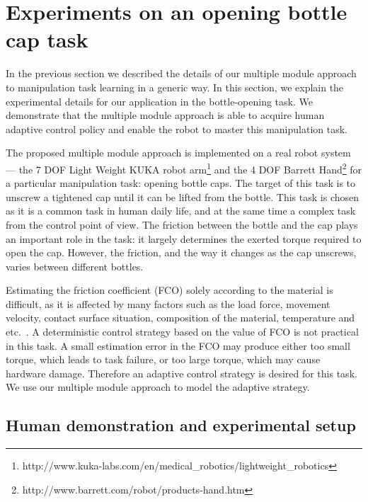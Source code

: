 \section{Experiments on an opening bottle cap task}
\label{cha4:sec3}

In the previous section we described the details of our multiple
module approach to manipulation task learning in a generic way. In this section,
we explain the experimental details for our application in the
bottle-opening task.  We demonstrate that the multiple module approach
is able to acquire human adaptive control policy and enable the robot
to master this manipulation task.

The proposed multiple module approach is implemented on a real robot system
--- the 7 DOF Light Weight KUKA robot arm\footnote{http://www.kuka-labs.com/en/medical\_robotics/lightweight\_robotics} and the 4 DOF Barrett Hand\footnote{http://www.barrett.com/robot/products-hand.htm}
for a particular manipulation task: opening bottle caps. The target of
this task is to unscrew a tightened cap until it can be lifted from
the bottle. This task is chosen as it is a common task in human daily
life, and at the same time a
complex task from the control point of view. The friction between the
bottle and the cap plays an important role in the task: it largely
determines the exerted torque required to open the cap. However, the
friction, and the way it changes as the cap unscrews, varies
between different bottles.


Estimating the friction coefficient (FCO) solely according to the
material is difficult, as it is affected by many factors such as the
load force, movement velocity, contact surface situation, composition
of the material, temperature and
etc.~\citep{gustafssoninvestigation}. A deterministic control strategy
based on the value of FCO is not practical in this task. A small
estimation error in the FCO may produce either too small torque,
which leads to task failure, or too large torque, which may cause
hardware damage. Therefore an adaptive control strategy is desired for
this
task.
We use our multiple module approach to model the adaptive strategy.




\subsection{Human demonstration and experimental setup}
\label{cha4:sec3:experimentsetup}

